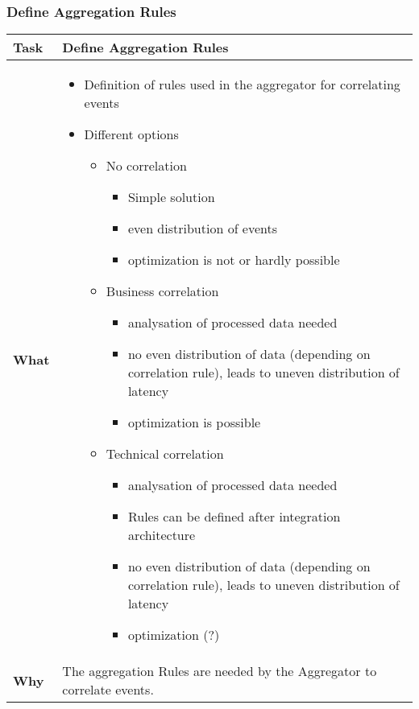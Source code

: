 \subsubsection{Define Aggregation Rules}
\begin{tabularx}{\textwidth}{@{} l X @{}}
	\caption{Define Aggregation Rules} \label{table:ch6_Task_Define_Aggregation_Rules}\\
	\toprule
	\bfseries Task & Define Aggregation Rules\\
	\midrule
	\bfseries What & 
	\begin{itemize}
		\item Definition of rules used in the aggregator for correlating events
		\item Different options
		\begin{itemize}
			\item No correlation
			\begin{itemize}
				\item Simple solution
				\item even distribution of events
				\item optimization is not or hardly possible
			\end{itemize}
			\item Business correlation
			\begin{itemize}
				\item analysation of processed data needed
				\item no even distribution of data (depending on correlation rule), leads to uneven distribution of latency
				\item optimization is possible
			\end{itemize}
			\item Technical correlation
			\begin{itemize}
				\item analysation of processed data needed
				\item Rules can be defined after integration architecture
				\item no even distribution of data (depending on correlation rule), leads to uneven distribution of latency
				\item optimization (?)
			\end{itemize}
		\end{itemize}
	\end{itemize}
	\\
	\midrule
	\bfseries Why & The aggregation Rules are needed by the Aggregator to correlate events.\\

\end{tabularx}
